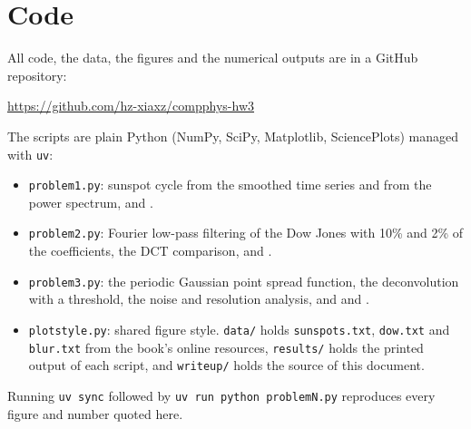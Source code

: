 \documentclass[11pt]{article}
\newcommand{\code}[1]{\texttt{#1}}
\begin{document}
\section*{Code}

All code, the data, the figures and the numerical outputs are in a GitHub
repository:
\begin{center}
\url{https://github.com/hz-xiaxz/compphys-hw3}
\end{center}
The scripts are plain Python (NumPy, SciPy, Matplotlib, SciencePlots) managed
with \code{uv}:
\begin{itemize}
\item \code{problem1.py}: sunspot cycle from the smoothed time series and from
the power spectrum, and .
\item \code{problem2.py}: Fourier low-pass filtering of the Dow Jones with 10\%
and 2\% of the coefficients, the DCT comparison, and
.
\item \code{problem3.py}: the periodic Gaussian point spread function, the
deconvolution with a threshold, the noise and resolution analysis, and
 and .
\item \code{plotstyle.py}: shared figure style. \code{data/} holds
\code{sunspots.txt}, \code{dow.txt} and \code{blur.txt} from the book's online
resources, \code{results/} holds the printed output of each script, and
\code{writeup/} holds the source of this document.
\end{itemize}
Running \code{uv sync} followed by \code{uv run python problemN.py} reproduces
every figure and number quoted here.
\end{document}
